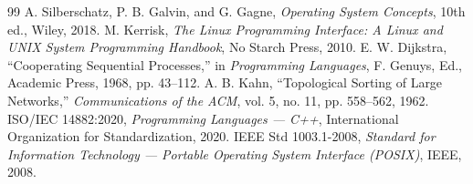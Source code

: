\documentclass[11pt,a4paper]{article}
\begin{document}
\begin{thebibliography}{99}
 A. Silberschatz, P. B. Galvin, and G. Gagne, \textit{Operating System Concepts}, 10th ed., Wiley, 2018.
 M. Kerrisk, \textit{The Linux Programming Interface: A Linux and UNIX System Programming Handbook}, No Starch Press, 2010.
 E. W. Dijkstra, ``Cooperating Sequential Processes,'' in \textit{Programming Languages}, F. Genuys, Ed., Academic Press, 1968, pp. 43--112.
 A. B. Kahn, ``Topological Sorting of Large Networks,'' \textit{Communications of the ACM}, vol. 5, no. 11, pp. 558--562, 1962.
 ISO/IEC 14882:2020, \textit{Programming Languages --- C++}, International Organization for Standardization, 2020.
 IEEE Std 1003.1-2008, \textit{Standard for Information Technology --- Portable Operating System Interface (POSIX)}, IEEE, 2008.
\end{thebibliography}
\end{document}

